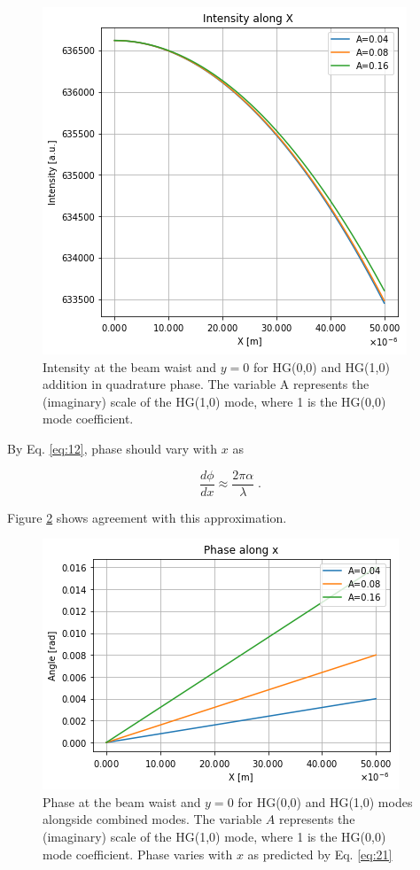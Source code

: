 \documentclass[aps,twoside,secnumarabic,balancelastpage,amsmath,amssymb,nofootinbib,hyperref=pdftex]{revtex4}
\begin{document}
	\begin{figure}
	\centering
		\includegraphics[scale=.7]{beamtiltint}
		\caption{Intensity at the beam waist and $y=0$ for HG(0,0) and HG(1,0) addition in quadrature phase. The variable A represents the (imaginary) scale of the HG(1,0) mode, where 1 is the HG(0,0) mode coefficient.}
		\label{fig:2}
	\end{figure}
	
By Eq. \ref{eq:12}, phase should vary with $x$ as
	
	\begin{equation}\label{eq:21}
		\frac{d\phi}{dx} \approx \frac{2 \pi \alpha}{\lambda} \; .
	\end{equation}

Figure \ref{fig:3} shows agreement with this approximation. 
	
	\begin{figure}
	\centering
		\includegraphics[scale=.7]{beamtiltphase}
		\caption{Phase at the beam waist and $y=0$ for HG(0,0) and HG(1,0) modes alongside combined modes. The variable $A$ represents the (imaginary) scale of the HG(1,0) mode, where 1 is the HG(0,0) mode coefficient. Phase varies with $x$ as predicted by Eq. \ref{eq:21}}
		\label{fig:3}
	\end{figure}
	
\end{document}
